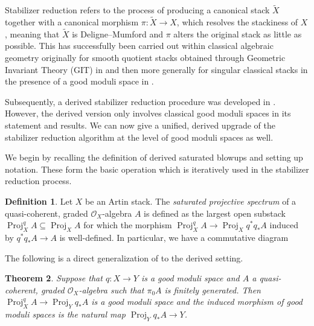 \documentclass[a4paper,twoside,11pt]{amsart}
\theoremstyle{plain}
\newtheorem{theorem}{Theorem}[section]
\theoremstyle{definition}
\newtheorem{definition}[theorem]{Definition}
\theoremstyle{remark}
\numberwithin{equation}{section}
\newcommand\sO{\mathcal{O}} %
\DeclareMathOperator{\Proj}{Proj} %
\newcommand{\oO}{\mathcal{O}}
\renewcommand{\tilde}{\widetilde}
\begin{document}
Stabilizer reduction refers to the process of producing a canonical stack $\tilde{X}$ together with a canonical morphism $\pi \colon \tilde{X} \to X$, which resolves the stackiness of $X$, meaning that $\tilde{X}$ is Deligne--Mumford and $\pi$ alters the original stack as little as possible. This has successfully been carried out within classical algebraic geometry originally for smooth quotient stacks obtained through Geometric Invariant Theory (GIT) in \cite{Kirwan} and then more generally for singular classical stacks in the presence of a good moduli space in \cite{EdidinRydh, Sav}. 

Subsequently, a derived stabilizer reduction procedure was developed in \cite{HRS}. However, the derived version only involves classical good moduli spaces in its statement and results. We can now give a unified, derived upgrade of the stabilizer reduction algorithm at the level of good moduli spaces as well.
\smallskip

We begin by recalling the definition of derived saturated blowups and setting up notation. These form the basic operation which is iteratively used in the stabilizer reduction process.  

\begin{definition}
    Let $X$ be an Artin stack. The \emph{saturated projective spectrum} of a quasi-coherent, graded $\sO_X$-algebra $A$ is defined as the largest open substack $\Proj^q_X A \subseteq \Proj_X A$ for which the morphism $\Proj^q_X A \to \Proj_X q^*q_*A$ induced by $q^*q_*A \to A $ is well-defined. In particular, we have a commutative diagram
    \begin{center}
    \end{center}
\end{definition}

The following is a direct generalization of \cite[Proposition~3.4]{EdidinRydh} to the derived setting.

\begin{theorem} \label{thm:gms of sat proj}
    Suppose that $q \colon X \to Y$ is a good moduli space and $A$ a quasi-coherent, graded $\oO_X$-algebra such that $\pi_0 A$ is finitely generated. Then $\Proj_X^q A \to \Proj_Y q_\ast A$ is a good moduli space and the induced morphism of good moduli spaces is the natural map $\Proj_Y q_\ast A \to Y$.
\end{theorem}
\end{document}

